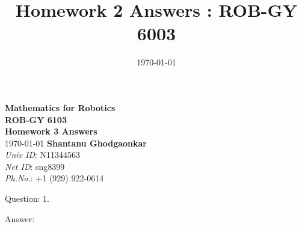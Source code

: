 \documentclass[a4paper]{article}
\title{Homework 2 Answers : ROB-GY 6003}
\author{\myName}
\date{\today}
\newcommand{\myName}{\textbf{Shantanu Ghodgaonkar}\\\textit{Univ ID}: N11344563\\\textit{Net ID}: sng8399\\\textit{Ph.No.}: +1 (929) 922-0614}
\begin{document}
	
	\begin{titlepage}
	    \centering
	    \vspace{2cm}
	    \Huge\textbf{Mathematics for Robotics \\ ROB-GY 6103 \\ Homework 3 Answers}
	    \vspace{1cm}
	    \\ \Large \today
	    \vfill
	    \Large \myName
	\end{titlepage}
	
	\begin{qalist}			
		\item[Question: 1.] \setcounter{equation}{0} %
		\item[Answer:] 
%			

\end{qalist}
\end{document}
